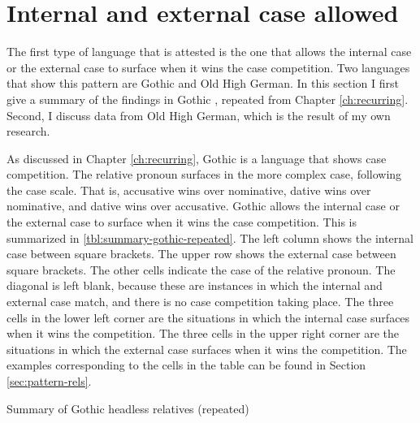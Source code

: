 \section{Internal and external case allowed}\label{sec:pattern-i}

The first type of language that is attested is the one that allows the internal case or the external case to surface when it wins the case competition. Two languages that show this pattern are Gothic and Old High German. In this section I first give a summary of the findings in Gothic \citep{harbert1978}, repeated from Chapter \ref{ch:recurring}. Second, I discuss data from Old High German, which is the result of my own research.

As discussed in Chapter \ref{ch:recurring}, Gothic is a language that shows case competition. The relative pronoun surfaces in the more complex case, following the case scale. That is, accusative wins over nominative, dative wins over nominative, and dative wins over accusative.
Gothic allows the internal case or the external case to surface when it wins the case competition. This is summarized in \ref{tbl:summary-gothic-repeated}. The left column shows the internal case between square brackets. The upper row shows the external case between square brackets. The other cells indicate the case of the relative pronoun. The diagonal is left blank, because these are instances in which the internal and external case match, and there is no case competition taking place.
The three cells in the lower left corner are the situations in which the internal case surfaces when it wins the competition. The three cells in the upper right corner are the situations in which the external case surfaces when it wins the competition.
The examples corresponding to the cells in the table can be found in Section \ref{sec:pattern-rels}.

\begin{table}[ht]
  \center
  \caption{Summary of Gothic headless relatives (repeated)}
    
    \label{tbl:summary-gothic-repeated}
\end{table}

